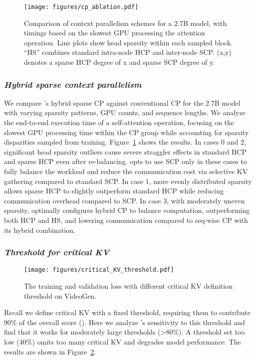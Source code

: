 \begin{figure}[t]
  \centering
  \texttt{[image: figures/cp\_ablation.pdf]} 
\caption{Comparison of context parallelism schemes for a 2.7B model, with timings based on the slowest GPU processing the attention operation. Line plots show head sparsity within each sampled block. ``HS'' combines standard intra-node HCP and inter-node SCP. \sys(x,y) denotes a sparse HCP degree of x and sparse SCP degree of y.}
  \label{figure:cp_ablation} 
\end{figure}


\subsubsection{\bf \em Hybrid sparse context parallelism} 
We compare \sys's hybrid sparse CP against conventional CP for the 2.7B model with varying sparsity patterns, GPU counts, and sequence lengths. 
We analyze the end-to-end execution time of a self-attention operation, focusing on the slowest GPU processing time within the CP group while accounting for sparsity disparities sampled from training. Figure~\ref{figure:cp_ablation} shows the results.
In cases 0 and 2, significant head sparsity outliers cause severe straggler effects in standard HCP and sparse HCP even after re-balancing. 
\sys opts to use SCP only in these cases to fully balance the workload and reduce the communication cost via selective KV gathering compared to standard SCP. 
In case 1, more evenly distributed sparsity allows sparse HCP to slightly outperform standard HCP while reducing communication overhead compared to SCP. In case 3, with moderately uneven sparsity, \sys optimally configures hybrid CP to balance computation, outperforming both HCP and HS, and lowering communication compared to seq-wise CP with its hybrid combination.


\subsubsection{\bf \em Threshold for critical KV} 


\begin{figure}[]
  \centering
  \texttt{[image: figures/critical\_KV\_threshold.pdf]} 
    \vspace{-0.1in}
\caption{The training and validation loss with different critical KV definition threshold on VideoGen. }
  \label{figure:critical_kv_threshold} 
\end{figure}



Recall we define critical KV with a fixed threshold, requiring them to contribute 90\% of the overall score (). 
Here we analyze \sys's sensitivity to this threshold and find that it works for moderately large thresholds (>80\%).
A threshold set too low (40\%) omits too many critical KV and degrades model performance.
The results are shown in Figure~\ref{figure:critical_kv_threshold}.









